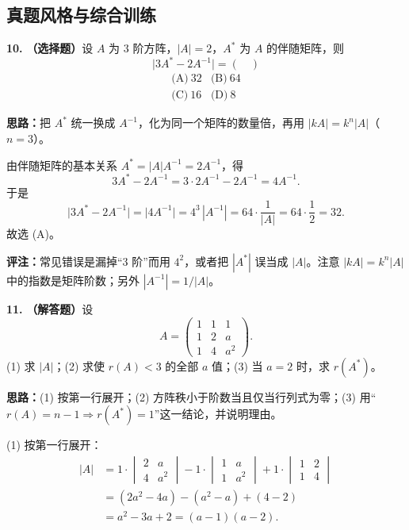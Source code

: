 \else \answerarea[10] \fi%

\subsection{真题风格与综合训练}

\textbf{10.} \textbf{（选择题）}设 \(A\) 为 \(3\) 阶方阵，\(|A|=2\)，\(A^*\) 为 \(A\) 的伴随矩阵，则
\[
\bigl|3A^*-2A^{-1}\bigr|=(\quad)
\]
\[
\begin{array}{ll}
\text{(A)}\ 32 & \text{(B)}\ 64\\[3pt]
\text{(C)}\ 16 & \text{(D)}\ 8
\end{array}
\]

\ifshowsolutions%
\textbf{思路：}把 \(A^*\) 统一换成 \(A^{-1}\)，化为同一个矩阵的数量倍，再用 \(|kA|=k^n|A|\)（\(n=3\)）。

由伴随矩阵的基本关系 \(A^*=|A|A^{-1}=2A^{-1}\)，得
\[
3A^*-2A^{-1}=3\cdot 2A^{-1}-2A^{-1}=4A^{-1}.
\]
于是
\[
\bigl|3A^*-2A^{-1}\bigr|=\bigl|4A^{-1}\bigr|=4^3\,|A^{-1}|=64\cdot\frac{1}{|A|}=64\cdot\frac12=32.
\]
故选 (A)。

\textbf{评注：}常见错误是漏掉“\(3\) 阶”而用 \(4^2\)，或者把 \(|A^*|\) 误当成 \(|A|\)。注意 \(|kA|=k^n|A|\) 中的指数是矩阵阶数；另外 \(|A^{-1}|=1/|A|\)。

\else \answerarea[5] \fi%

\textbf{11.} \textbf{（解答题）}设
\[
A=\begin{pmatrix}
1&1&1\\
1&2&a\\
1&4&a^2
\end{pmatrix}.
\]
(1) 求 \(|A|\)；\qquad (2) 求使 \(r(A)<3\) 的全部 \(a\) 值；\qquad (3) 当 \(a=2\) 时，求 \(r(A^*)\)。

\ifshowsolutions%
\textbf{思路：}(1) 按第一行展开；(2) 方阵秩小于阶数当且仅当行列式为零；(3) 用“\(r(A)=n-1\Rightarrow r(A^*)=1\)”这一结论，并说明理由。

(1) 按第一行展开：
\[
\begin{aligned}
|A|&=1\cdot\begin{vmatrix}2&a\\4&a^2\end{vmatrix}
-1\cdot\begin{vmatrix}1&a\\1&a^2\end{vmatrix}
+1\cdot\begin{vmatrix}1&2\\1&4\end{vmatrix}\\
&=(2a^2-4a)-(a^2-a)+(4-2)\\
&=a^2-3a+2=(a-1)(a-2).
\end{aligned}
\]

